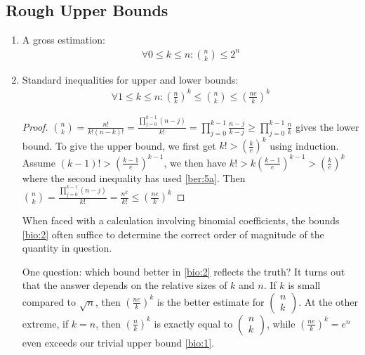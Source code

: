 \documentclass{article}
\begin{document}
\subsection{Rough Upper Bounds}
\begin{enumerate}
\item A gross estimation:
\begin{align}
    \forall 0\le k \le n : \binom{n}{k}\le 2^n \label{bio:1}
\end{align}
\item Standard inequalities for upper and lower bounds:
\begin{align}
    \forall 1\le k \le n : \left(\frac{n}{k}\right)^k\le \binom{n}{k}\le \left(\frac{ne}{k}\right)^k \label{bio:2}
\end{align}
\begin{proof}
$\binom{n}{k}=\frac{n!}{k!(n-k)!} = \frac{\prod_{j=0}^{k-1} (n-j)}{k!}=\prod_{j=0}^{k-1} \frac{n-j}{k-j}\ge \prod_{j=0}^{k-1}\frac{n}{k}$ gives the lower bound. To give the upper bound, we first get $k!>\left(\frac{k}{e}\right)^k$ using induction. Assume $(k-1)!>\left(\frac{k-1}{e}\right)^{k-1}$, we then have $k!>k \left(\frac{k-1}{e}\right)^{k-1} > \left(\frac{k}{e}\right)^k$ where the second inequality has used \cref{ber:5a}. Then $\binom{n}{k}=\frac{\prod_{j=0}^{k-1} (n-j)}{k!}=\frac{n^k}{k!}\le \left(\frac{ne}{k}\right)^k$

\end{proof}
\begin{rema}
When faced with a calculation involving binomial coefficients, the bounds \cref{bio:2} often suffice to determine the correct order of magnitude of the quantity in question. 

One question: which bound better in \cref{bio:2} reflects the truth? It turns out that the answer depends on the relative sizes of $k$ and $n$.  If $k$ is small compared to $\sqrt{n}$, then $\left(\frac{n e}{k}\right)^{k}$ is the better estimate for $\left(\begin{array}{l}n \\ k\end{array}\right)$. At the other extreme, if $k=n$, then $\left(\frac{n}{k}\right)^{k}$ is exactly equal to $\left(\begin{array}{l}n \\ k\end{array}\right)$, while $\left(\frac{n e}{k}\right)^{k}=e^{n}$ even exceeds our trivial upper bound \cref{bio:1}.

\end{rema}
\end{enumerate}
\end{document}
